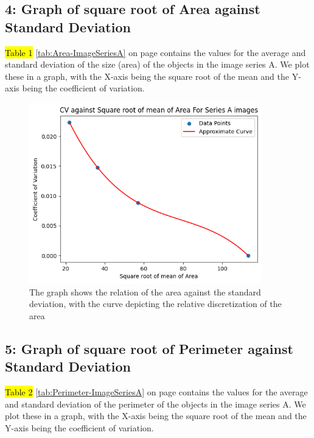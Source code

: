 \documentclass[runningheads]{llncs}
\begin{document}
\subsection*{4: Graph of square root of Area against Standard Deviation}
\hl{Table 1} \ref{tab:Area-ImageSeriesA} on page \pageref{tab:Area-ImageSeriesA} contains the values for the average and standard deviation of the size (area) of the objects in the image series A. We plot these in a graph, with the X-axis being the square root of the mean and the Y-axis being the coefficient of variation. 

\begin{figure}[h!]
\centering
\includegraphics[width=0.9\textwidth]{Report/Result_Images/2.2_area.png}
\caption{The graph shows the relation of the area against the standard deviation, with the curve depicting the relative discretization of the area}
\label{area-relation-A}
\end{figure}

\subsection*{5: Graph of square root of Perimeter against Standard Deviation}
\hl{Table 2} \ref{tab:Perimeter-ImageSeriesA} on page \pageref{tab:Perimeter-ImageSeriesA} contains the values for the average and standard deviation of the perimeter of the objects in the image series A. We plot these in a graph, with the X-axis being the square root of the mean and the Y-axis being the coefficient of variation. 
\end{document}
